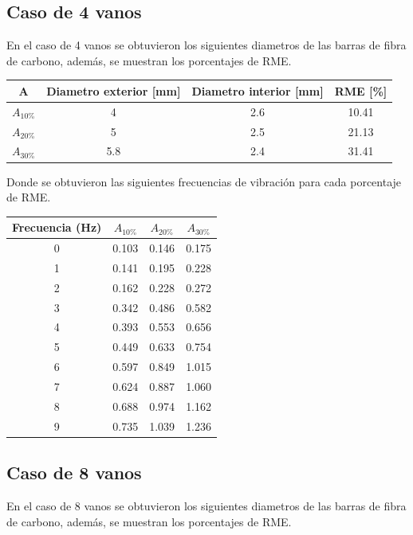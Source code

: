 \subsection{Caso de 4 vanos}
En el caso de 4 vanos se obtuvieron los siguientes diametros de las barras de fibra de carbono, además, se muestran los porcentajes de RME.

\begin{table}[H]
    \centering
    \begin{tabular}{cccc}
    \toprule
     A & Diametro exterior [mm] & Diametro interior [mm] & RME [\%] \\
    \midrule
     $A_{10\%}$ &  4 &  2.6 &  10.41 \\
     $A_{20\%}$ &  5 &  2.5 &  21.13 \\
     $A_{30\%}$ &  5.8 &  2.4 &  31.41 \\
    \bottomrule
    \end{tabular}
\end{table}

Donde se obtuvieron las siguientes frecuencias de vibración para cada porcentaje de RME.

\begin{table}[H]
    \centering
    \begin{tabular}{cccc}
    \toprule
     Frecuencia (Hz) & $A_{10\%}$ & $A_{20\%}$ & $A_{30\%}$ \\
    \midrule
     0 &       0.103 &       0.146 &       0.175 \\
     1 &       0.141 &       0.195 &       0.228 \\
     2 &       0.162 &       0.228 &       0.272 \\
     3 &       0.342 &       0.486 &       0.582 \\
     4 &       0.393 &       0.553 &       0.656 \\
     5 &       0.449 &       0.633 &       0.754 \\
     6 &       0.597 &       0.849 &       1.015 \\
     7 &       0.624 &       0.887 &       1.060 \\
     8 &       0.688 &       0.974 &       1.162 \\
     9 &       0.735 &       1.039 &       1.236 \\
    \bottomrule
    \end{tabular}
\end{table}


\subsection{Caso de 8 vanos}
En el caso de 8 vanos se obtuvieron los siguientes diametros de las barras de fibra de carbono, además, se muestran los porcentajes de RME.

